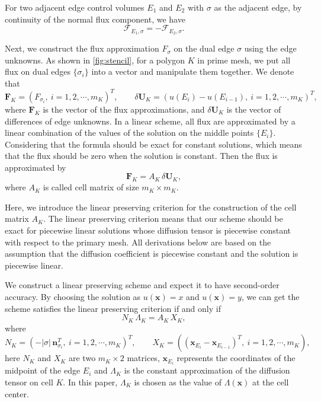 \documentclass[times,review,preprint]{elsarticle}
\newcommand{\bx}{\bm{x}}
\newcommand{\bn}{\bm{n}}
\begin{document}
For two adjacent edge control volumes $E_1$ and $E_2$ with $\sigma$ as the adjacent edge, by continuity of the normal flux component, we have
\begin{equation*}
\mathcal{F}_{E_1, \sigma} = - \mathcal{F}_{E_2, \sigma}.
\end{equation*}

Next, we construct the flux approximation $F_{\sigma}$ on the dual edge $\sigma$ using the edge unknowns.
As shown in \cref{fig:stencil}, for a polygon $K$ in prime mesh, we put all flux on dual edges $\{\sigma_{i}\}$ into a vector and manipulate them together. We denote that
\begin{equation}\label{eq:deffu}
\mathbf{F}_K = (F_{\sigma_{i}}, \ i = 1,2,\cdots,m_K)^T, \qquad \delta \mathbf{U}_K = (u(E_{i}) - u(E_{i-1}), \ i = 1,2,\cdots,m_K)^T,
\end{equation}
where $\mathbf{F}_K$ is the vector of the flux approximations, and $\delta \mathbf{U}_K$ is the vector of differences of edge unknowns.
In a linear scheme, all flux are approximated by a linear combination of the values of the solution on the middle points $\{E_{i}\}$. Considering that the formula should be exact for constant solutions, which means that the flux should be zero when the solution is constant. Then the flux is approximated by
\begin{equation}\label{eq:fluxapp}
\mathbf{F}_K = A_K \, \delta \mathbf{U}_K,
\end{equation}
where $A_K$ is called cell matrix of size $m_K \times m_K$.

Here, we introduce the linear preserving criterion for the construction of the cell matrix $A_K$. The linear preserving criterion means that our scheme should be exact for piecewise linear solutions whose diffusion tensor is piecewise constant with respect to the primary mesh. All derivations below are based on the assumption that the diffusion coefficient is piecewise constant and the solution is piecewise linear.

We construct a linear preserving scheme and expect it to have second-order accuracy. By choosing the solution as $u(\bx) = x$ and $u(\bx) = y$, we can get the scheme satisfies the linear preserving criterion if and only if
\begin{equation}\label{eq:lpmat}
N_K \, \Lambda_K = A_K \, X_K,
\end{equation}
where
\begin{equation}\label{eq:defnx}
N_K = (- |\sigma| \, \bn_{\sigma_{i}}^T, \ i = 1,2,\cdots,m_K)^T, \qquad X_K = ((\bx_{E_{i}} - \bx_{E_{i-1}})^T, \ i = 1,2,\cdots,m_K),
\end{equation}
here $N_K$ and $X_K$ are two $m_K \times 2$ matrices, $\bx_{E_i}$ represents the coordinates of the midpoint of the edge $E_i$ and $\Lambda_K$ is the constant approximation of the diffusion tensor on cell $K$. In this paper, $\Lambda_K$ is chosen as the value of $\Lambda(\bx)$ at the cell center.
\end{document}
